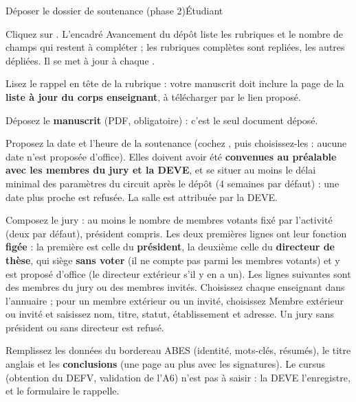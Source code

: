 \documentclass[11pt,a4paper]{article}
\begin{document}
\begin{procedure}{Déposer le dossier de soutenance (phase 2)}{Étudiant}
\begin{etapes}
  \item Cliquez sur . L'encadré
        \og Avancement du dépôt\fg{} liste les rubriques et le nombre de champs
        qui restent à compléter ; les rubriques complètes sont repliées, les
        autres dépliées. Il se met à jour à chaque .
  \item Lisez le rappel en tête de la rubrique : votre manuscrit doit inclure
        la page de la \textbf{liste à jour du corps enseignant}, à télécharger
        par le lien proposé.
  \item Déposez le \textbf{manuscrit} (PDF, obligatoire) : c'est le seul
        document déposé.
  \item Proposez la date et l'heure de la soutenance (cochez
        , puis choisissez-les : aucune date n'est proposée
        d'office). Elles doivent avoir été \textbf{convenues au préalable avec
        les membres du jury et la DEVE}, et se situer au moins le délai minimal
        des paramètres du circuit après le dépôt (4 semaines par défaut) : une
        date plus proche est refusée. La salle est attribuée par la DEVE.
  \item Composez le jury : au moins le nombre de membres votants fixé par
        l'activité (deux par défaut), président compris. Les deux premières
        lignes ont leur fonction \textbf{figée} : la première est celle du
        \textbf{président}, la deuxième celle du \textbf{directeur de thèse},
        qui siège \textbf{sans voter} (il ne compte pas parmi les membres
        votants) et y est proposé d'office (le directeur extérieur s'il y en a
        un). Les lignes suivantes sont des \og membres du jury\fg{} ou des
        \og membres invités\fg{}. Choisissez chaque enseignant dans
        l'annuaire ; pour un membre extérieur ou un invité, choisissez
        \og Membre extérieur ou invité\fg{} et saisissez nom, titre, statut,
        établissement et adresse. Un jury sans président ou sans directeur est
        refusé.
  \item Remplissez les données du bordereau ABES (identité, mots-clés,
        résumés), le titre anglais et les \textbf{conclusions} (une page au plus
        avec les signatures). Le cursus (obtention du DEFV, validation de l'A6)
        n'est pas à saisir : la DEVE l'enregistre, et le formulaire le rappelle.

\end{etapes}
\end{procedure}
\end{document}
